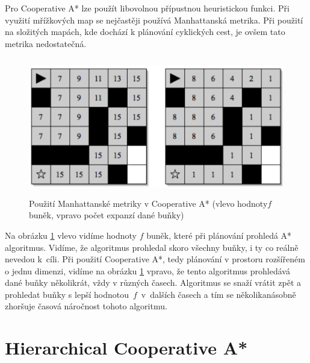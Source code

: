 Pro Cooperative A* lze použít libovolnou přípustnou heuristickou funkci. Při využití mřížkových map se nejčastěji používá Manhattanská metrika. Při použití na složitých mapách, kde dochází k plánování cyklických cest, je ovšem tato metrika nedostatečná.

\begin{figure}[htb]
	\begin{center}
		\includegraphics*[width=15cm,height=6cm,keepaspectratio]{obr/coopManh}
	\end{center}
	\caption[caption]{\centering Použití Manhattanské metriky v Cooperative A* (vlevo hodnoty\linebreak $f$ buněk, vpravo počet expanzí dané buňky) \cite{Silver2006}}
	\label{obr:coopManh}
\end{figure}

Na obrázku \ref{obr:coopManh} vlevo vidíme hodnoty $f$ buněk, které při plánování prohledá A* algoritmus. Vidíme, že algoritmus prohledal skoro všechny buňky, i ty co reálně nevedou k~cíli. Při použití Cooperative A*, tedy plánování v prostoru rozšířeném o jednu dimenzi, vidíme na obrázku \ref{obr:coopManh} vpravo, že tento algoritmus prohledává dané buňky několikrát, vždy v různých časech. Algoritmus se snaží vrátit zpět a prohledat buňky s lepší hodnotou~$f$~v~dalších časech a tím se několikanásobně zhoršuje časová náročnost tohoto algoritmu.

\section{Hierarchical Cooperative A*}\label{sec:HCA}


